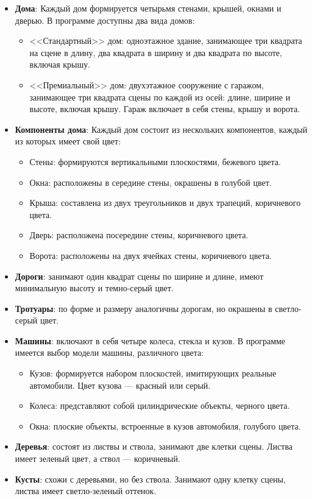 \begin{itemize}
\item \textbf{Дома}: Каждый дом формируется четырьмя стенами, крышей, окнами и дверью. В программе доступны два вида домов:
\begin{itemize}
\item <<Стандартный>> дом: одноэтажное здание, занимающее три квадрата на сцене в длину, два квадрата в ширину и два квадрата по высоте, включая крышу.
\item <<Премиальный>> дом: двухэтажное сооружение с гаражом, занимающее три квадрата сцены по каждой из осей: длине, ширине и высоте, включая крышу. Гараж включает в себя стены, крышу и ворота.
\end{itemize}
\item \textbf{Компоненты дома}: Каждый дом состоит из нескольких компонентов, каждый из которых имеет свой цвет:
\begin{itemize}
\item Стены: формируются вертикальными плоскостями, бежевого цвета.
\item Окна: расположены в середине стены, окрашены в голубой цвет.
\item Крыша: составлена из двух треугольников и двух трапеций, коричневого цвета.
\item Дверь: расположена посередине стены, коричневого цвета.
\item Ворота: расположены на двух ячейках стены, коричневого цвета.
\end{itemize}
\item \textbf{Дороги}: занимают один квадрат сцены по ширине и длине, имеют минимальную высоту и темно-серый цвет.
\item \textbf{Тротуары}: по форме и размеру аналогичны дорогам, но окрашены в светло-серый цвет.
\item \textbf{Машины}: включают в себя четыре колеса, стекла и кузов. В программе имеется выбор модели машины,  различного цвета:
\begin{itemize}
\item Кузов: формируется набором плоскостей, имитирующих реальные автомобили. Цвет кузова --- красный или серый.
\item Колеса: представляют собой цилиндрические объекты, черного цвета.
\item Окна: плоские объекты, встроенные в кузов автомобиля, голубого цвета.
\end{itemize}
\item \textbf{Деревья}: состоят из листвы и ствола, занимают две клетки сцены. Листва имеет зеленый цвет, а ствол --- коричневый.
\item \textbf{Кусты}: схожи с деревьями, но без ствола. Занимают одну клетку сцены, листва имеет светло-зеленый оттенок.
\end{itemize}

